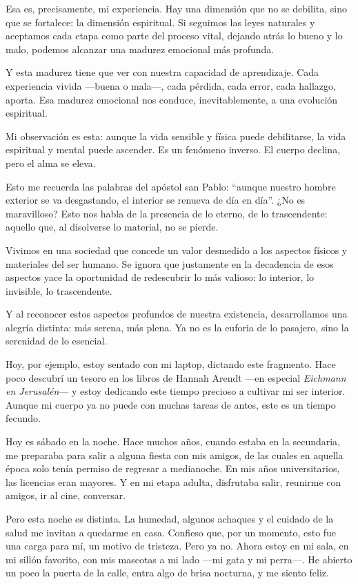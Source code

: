 \documentclass[12pt]{article}
\begin{document}
Esa es, precisamente, mi experiencia. Hay una dimensión que no se debilita, sino que se fortalece: la dimensión espiritual. Si seguimos las leyes naturales y aceptamos cada etapa como parte del proceso vital, dejando atrás lo bueno y lo malo, podemos alcanzar una madurez emocional más profunda.

Y esta madurez tiene que ver con nuestra capacidad de aprendizaje. Cada experiencia vivida —buena o mala—, cada pérdida, cada error, cada hallazgo, aporta. Esa madurez emocional nos conduce, inevitablemente, a una evolución espiritual.

Mi observación es esta: aunque la vida sensible y física puede debilitarse, la vida espiritual y mental puede ascender. Es un fenómeno inverso. El cuerpo declina, pero el alma se eleva.

Esto me recuerda las palabras del apóstol san Pablo: “aunque nuestro hombre exterior se va desgastando, el interior se renueva de día en día”. ¿No es maravilloso? Esto nos habla de la presencia de lo eterno, de lo trascendente: aquello que, al disolverse lo material, no se pierde.

Vivimos en una sociedad que concede un valor desmedido a los aspectos físicos y materiales del ser humano. Se ignora que justamente en la decadencia de esos aspectos yace la oportunidad de redescubrir lo más valioso: lo interior, lo invisible, lo trascendente.

Y al reconocer estos aspectos profundos de nuestra existencia, desarrollamos una alegría distinta: más serena, más plena. Ya no es la euforia de lo pasajero, sino la serenidad de lo esencial.

Hoy, por ejemplo, estoy sentado con mi laptop, dictando este fragmento. Hace poco descubrí un tesoro en los libros de Hannah Arendt —en especial \textit{Eichmann en Jerusalén}— y estoy dedicando este tiempo precioso a cultivar mi ser interior. Aunque mi cuerpo ya no puede con muchas tareas de antes, este es un tiempo fecundo.

Hoy es sábado en la noche. Hace muchos años, cuando estaba en la secundaria, me preparaba para salir a alguna fiesta con mis amigos, de las cuales en aquella época solo tenía permiso de regresar a medianoche. En mis años universitarios, las licencias eran mayores. Y en mi etapa adulta, disfrutaba salir, reunirme con amigos, ir al cine, conversar.

Pero esta noche es distinta. La humedad, algunos achaques y el cuidado de la salud me invitan a quedarme en casa. Confieso que, por un momento, esto fue una carga para mí, un motivo de tristeza. Pero ya no. Ahora estoy en mi sala, en mi sillón favorito, con mis mascotas a mi lado —mi gata y mi perra—. He abierto un poco la puerta de la calle, entra algo de brisa nocturna, y me siento feliz.
\end{document}
